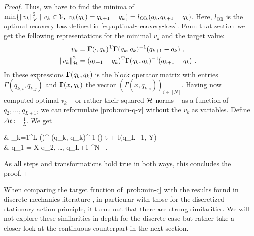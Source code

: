 \begin{proof}
	Thus, we have to find the minima of $\min\{\norm{v_k}_{\mathcal{V}}^2\ |\ v_k \in \mathcal{V},\ v_k(q_k) = q_{k+1} - q_k\} = l_{\text{OR}}(q_k, q_{k+1} - q_k)$.
	Here, $l_{\text{OR}}$ is the optimal recovery loss defined in \cref{eq:optimal-recovery-loss}.
	From that section we get the following representations for the minimal $v_k$ and the target value:
	\begin{align}
		v_k & = \mathbf{\Gamma}(\cdot, q_k)^\mathrm{T}\mathbf{\Gamma}(q_k, q_k)^{-1} (q_{k+1} - q_k) \ ,\\
		\norm{v_k}_{\mathcal{H}}^2 &= (q_{k+1} - q_k)^\mathrm{T} \mathbf{\Gamma}(q_k, q_k)^{-1} (q_{k+1} - q_k) \ .
	\end{align}
	In these expressions $\mathbf{\Gamma}(q_k, q_k)$ is the block operator matrix with entries $\Gamma(q_{k,i}, q_{k, j})$ and $\mathbf{\Gamma}(x, q_k)$ the vector $(\Gamma(x, q_{k, i}))_{i \in [N]}$.
	Having now computed optimal $v_k$ -- or rather their squared $\mathcal{H}$-norms -- as a function of $q_2, \ldots, q_{L+1}$, we can reformulate \cref{prob:min-q-v} without the $v_k$ as variables.
	Define $\Delta t \coloneqq \frac{1}{L}$.
	We get
	\begin{problem}
		\begin{cases}
			 & \nu \cdot {} \sum_{k=1}^{L}  
			\left(\right)^ \bGamma(q_k, q_k)^{-1}
			\left(\right) \cdot \Delta t
			+ l(q_{L+1}, Y) \\
			 & q_1 = X  q_2, \ldots, q_{L+1} \in \cX^N \ .
		\end{cases}
	\end{problem}
	As all steps and transformations hold true in both ways, this concludes the proof.
\end{proof}

When comparing the target function of \cref{prob:min-q} with the results found in discrete mechanics literature \cite[~Chapter VI.6.2]{hairer06}, in particular with those for the discretized stationary action principle, it turns out that there are strong similarities.
We will not explore these similarities in depth for the discrete case but rather take a closer look at the continuous counterpart in the next section.